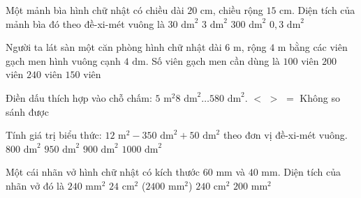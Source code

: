\begin{ex} %
Một mảnh bìa hình chữ nhật có chiều dài $20\text{ cm}$, chiều rộng $15\text{ cm}$. Diện tích của mảnh bìa đó theo đề-xi-mét vuông là
\choice
{$30\text{ dm}^2$}
{\True $3\text{ dm}^2$}
{$300\text{ dm}^2$}
{$0{,}3\text{ dm}^2$}
\end{ex}

\begin{ex} %
Người ta lát sàn một căn phòng hình chữ nhật dài $6\text{ m}$, rộng $4\text{ m}$ bằng các viên gạch men hình vuông cạnh $4\text{ dm}$. Số viên gạch men cần dùng là
\choice
{$100$ viên}
{$200$ viên}
{$240$ viên}
{\True $150$ viên}
\end{ex}

\begin{ex} %
Điền dấu thích hợp vào chỗ chấm: $5\text{ m}^2 8\text{ dm}^2 \dots 580\text{ dm}^2$.
\choice
{\True $<$}
{$>$}
{$=$}
{Không so sánh được}
\end{ex}

\begin{ex} %
Tính giá trị biểu thức: $12\text{ m}^2 - 350\text{ dm}^2 + 50\text{ dm}^2$ theo đơn vị đề-xi-mét vuông.
\choice
{$800\text{ dm}^2$}
{$950\text{ dm}^2$}
{\True $900\text{ dm}^2$}
{$1000\text{ dm}^2$}
\end{ex}

\begin{ex} %
Một cái nhãn vở hình chữ nhật có kích thước $60\text{ mm}$ và $40\text{ mm}$. Diện tích của nhãn vở đó là
\choice
{$240\text{ mm}^2$}
{\True $24\text{ cm}^2$ ($2400\text{ mm}^2$)}
{$240\text{ cm}^2$}
{$200\text{ mm}^2$}
\end{ex}

